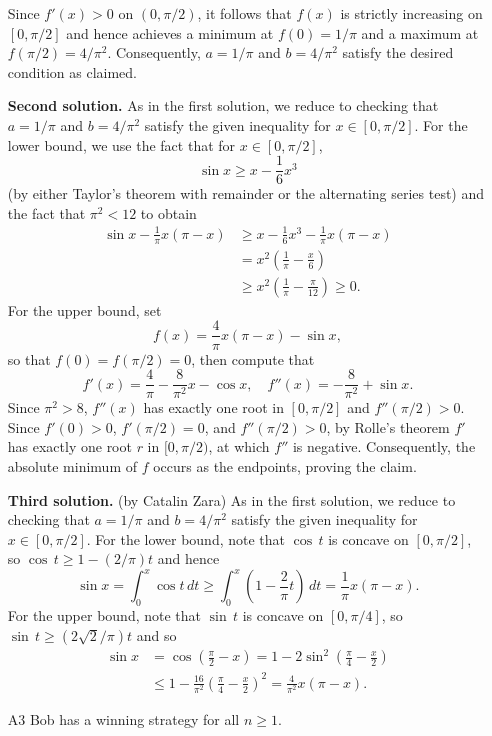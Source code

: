 \documentclass[amssymb,twocolumn,pra,10pt,aps]{revtex4-1}
\begin{document}
\begin{itemize}
Since $f'(x)>0$ on $(0,\pi/2)$, it follows that $f(x)$ is strictly increasing on $[0,\pi/2]$ and hence achieves a minimum at $f(0) = 1/\pi$ and a maximum at $f(\pi/2) = 4/\pi^2$. Consequently, $a=1/\pi$ and $b=4/\pi^2$ satisfy the desired condition as claimed.

\noindent
\textbf{Second solution.}
As in the first solution, we reduce to checking that $a=1/\pi$ and $b = 4/\pi^2$ satisfy the given inequality for $x \in [0, \pi/2]$.
For the lower bound, we use the fact that for $x \in [0, \pi/2]$,
\[
\sin x \geq x - \frac{1}{6} x^3
\]
(by either Taylor's theorem with remainder or the alternating series test) and the fact that $\pi^2 < 12$ to obtain
\begin{align*}
\sin x - \frac{1}{\pi} x(\pi - x) &\geq x - \frac{1}{6} x^3 - \frac{1}{\pi}x(\pi-x) \\
&= x^2 \left( \frac{1}{\pi} - \frac{x}{6} \right) \\
&\geq x^2 \left( \frac{1}{\pi} - \frac{\pi}{12} \right) \geq 0.
\end{align*}
For the upper bound, set
\[
f(x) = \frac{4}{\pi} x(\pi-x) - \sin x,
\]
so that $f(0) = f(\pi/2) = 0$, then compute that
\[
f'(x) = \frac{4}{\pi} - \frac{8}{\pi^2} x - \cos x, \quad
f''(x) = -\frac{8}{\pi^2} + \sin x.
\]
Since $\pi^2 > 8$, $f''(x)$ has exactly one root in $[0, \pi/2]$ and $f''(\pi/2) > 0$.
Since $f'(0)> 0$, $f'(\pi/2) = 0$, and $f''(\pi/2) > 0$, 
by Rolle's theorem $f'$ has exactly one root $r$ in $[0, \pi/2)$,
at which $f''$ is negative. Consequently, the absolute minimum of $f$ occurs as the endpoints,
proving the claim.

\noindent
\textbf{Third solution.} (by Catalin Zara)
As in the first solution, we reduce to checking that $a=1/\pi$ and $b = 4/\pi^2$ satisfy the given inequality for $x \in [0, \pi/2]$. For the lower bound, note that
$\cos \,t$ is concave on $[0, \pi/2]$, so $\cos \,t \geq 1 - (2/\pi)t$ and hence
\[
\sin x = \int_0^x \cos t\,dt \geq \int_0^x \left(1 - \frac{2}{\pi} t\right)\,dt  = \frac{1}{\pi}x(\pi-x).
\]
For the upper bound, note that $\sin \,t$ is concave on $[0, \pi/4]$, so $\sin \,t \geq (2\sqrt{2}/\pi)t$
and so
\begin{align*}
\sin x &= \cos \left( \frac{\pi}{2} - x \right)= 1 - 2 \sin^2 \left( \frac{\pi}{4} - \frac{x}{2} \right) \\
&\leq 1 - \frac{16}{\pi^2} \left( \frac{\pi}{4} - \frac{x}{2} \right)^2 = \frac{4}{\pi^2} x(\pi-x).
\end{align*}


\item[A3]
Bob has a winning strategy for all $n \geq 1$.


\end{itemize}
\end{document}
